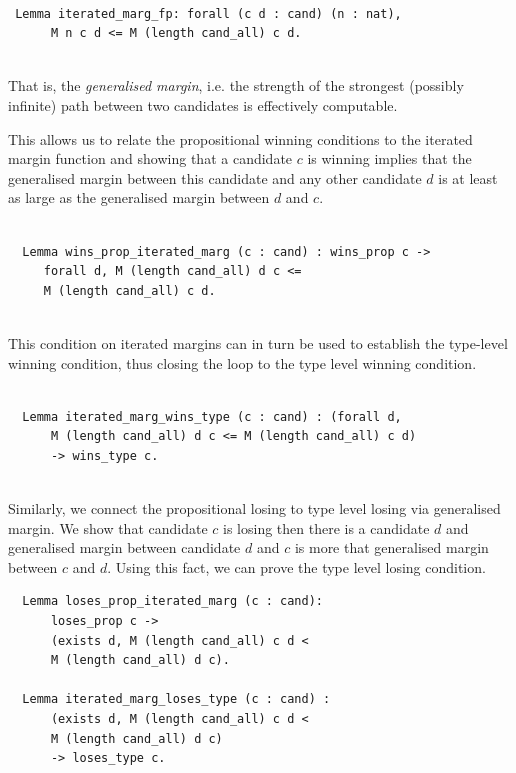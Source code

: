 \begin{verbatim}

 Lemma iterated_marg_fp: forall (c d : cand) (n : nat),
      M n c d <= M (length cand_all) c d.
      
\end{verbatim}


\noindent
That is, the \emph{generalised margin}, i.e. the strength of the strongest (possibly infinite) path
between two candidates is effectively computable.

This allows us to relate the propositional winning conditions to the
iterated margin function and showing that a candidate $c$ is winning
implies that the generalised margin between this candidate and any
other candidate $d$ is at least as large as the generalised margin between $d$
and $c$.

\begin{verbatim}

  Lemma wins_prop_iterated_marg (c : cand) : wins_prop c ->
     forall d, M (length cand_all) d c <=  
     M (length cand_all) c d.
                   
\end{verbatim}

\noindent
This condition on iterated margins can in turn be used to establish the
type-level winning condition, thus closing the loop to the type
level winning condition.

\begin{verbatim}

  Lemma iterated_marg_wins_type (c : cand) : (forall d,
      M (length cand_all) d c <= M (length cand_all) c d) 
      -> wins_type c.
      
\end{verbatim}

Similarly, we connect the propositional losing to type level losing via generalised margin. We show that 
candidate $c$ is losing then there is a candidate $d$ and generalised margin between candidate $d$ and 
$c$ is more that generalised margin between $c$ and $d$.  Using this fact, we can prove the 
type level losing condition. 

\begin{verbatim} 
  Lemma loses_prop_iterated_marg (c : cand):
      loses_prop c ->
      (exists d, M (length cand_all) c d < 
      M (length cand_all) d c).

  Lemma iterated_marg_loses_type (c : cand) :
      (exists d, M (length cand_all) c d < 
      M (length cand_all) d c) 
      -> loses_type c.
\end{verbatim}


